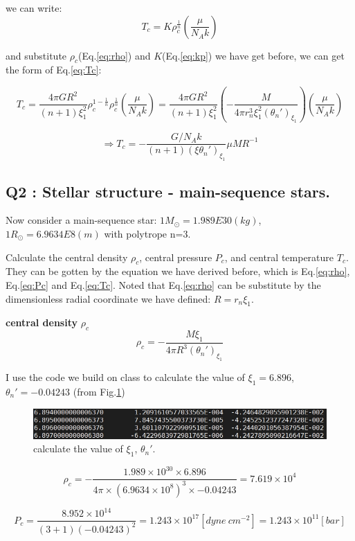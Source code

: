 \documentclass{article}
\begin{document}
we can write:
\begin{equation}
    T_c=K\rho_c ^{\frac{1}{n}}(\frac{\mu}{N_A k})
\end{equation}

and substitute $\rho_c$(Eq.\ref{eq:rho}) and $K$(Eq.\ref{eq:kp}) we have get before, we can get the form of Eq.\ref{eq:Tc}:

$$
T_c
=\frac{4\pi G R^2}{(n+1)\xi_1^2}\rho_c^{1-\frac{1}{n}}\rho_c^{\frac{1}{n}}(\frac{\mu}{N_A k})
=\frac{4\pi G R^2}{(n+1)\xi_1^2}(-\frac{M}{4\pi r_n^3\xi_1^2(\theta_n')_{\xi_1}})(\frac{\mu}{N_A k})
$$


$$
\Rightarrow T_c=-\frac{G/N_A k}{(n+1)(\xi\theta_n')_{\xi_{1}}}\mu MR^{-1}
$$

\subsection*{Q2 : Stellar structure - main-sequence stars.}
Now consider a main-sequence star: $1M_{\odot}=1.989E30(kg)$, $1R_{\odot}=6.9634E8(m) $ with polytrope n=3.

Calculate the central density $\rho_c$, central pressure $P_c$, and central temperature $T_c$. They can be gotten by the equation we have derived before, which is Eq.\ref{eq:rho}, Eq.\ref{eq:Pc} and Eq.\ref{eq:Tc}.
Noted that Eq.\ref{eq:rho} can be substitute by the dimensionless radial coordinate we have defined: $R=r_n\xi_1$.

\textbf{central density} $\rho_c$
$$
\rho_c=-\frac{M\xi_1}{4\pi R^3 (\theta_n')_{\xi_1}}
$$

I use the code we build on class to calculate the value of $\xi_1=6.896$, $\theta_n'=-0.04243$ (from Fig.\ref{fig:pro2})

\begin{figure}
    \centering 
	\includegraphics[scale=0.45]{pro2.jpg}
	\caption{calculate the value of $\xi_1$, $\theta_n'$.} %
	\label{fig:pro2} %
\end{figure}

$$
\rho_c=-
\frac{ 1.989\times10^{30} \times 6.896}
{4\pi \times (6.9634 \times 10^8)^3 \times -0.04243}
= 7.619 \times 10^4
$$

$$
P_c=
\frac{8.952 \times 10^{14}}
{(3+1)(-0.04243)^2}
=1.243 \times 10^{17}
[dyne\ cm^{-2}]
=1.243 \times 10^{11}  [bar]
$$
\end{document}
